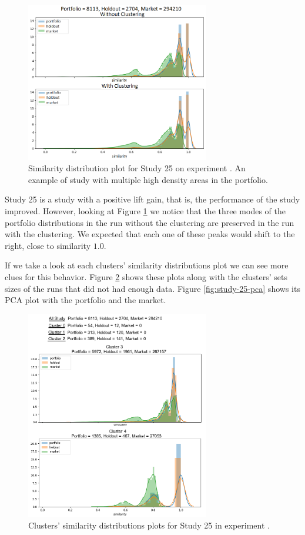 \begin{figure}[H]
   \centering
   \includegraphics[width=8cm]{fig/ch4-bump-study-25.png}
   \caption{Similarity distribution plot for Study 25 on experiment \nameExperimentII{}. An example of study with multiple high density areas in the portfolio.}
   \label{fig:bump-study-25}
\end{figure}

Study 25 is a study with a positive lift gain, that is, the performance of the study improved. However, looking at Figure \ref{fig:bump-study-25} we notice that the three modes of the portfolio distributions in the run without the clustering are preserved in the run with the clustering. We expected that each one of these peaks would shift to the right, close to similarity $1.0$. 

If we take a look at each clusters' similarity distributions plot we can see more clues for this behavior. Figure \ref{fig:study-25-clusters-simi-plot} shows these plots along with the clusters' sets sizes of the runs that did not had enough data. Figure \ref{fig:study-25-pca} shows its PCA plot with the portfolio and the market. 

\begin{figure}[!ht]
   \centering
   \includegraphics[width=8cm]{fig/ch4-study-25-clusters-simi-plot.png}
   \caption{Clusters' similarity distributions plots for Study 25 in experiment \nameExperimentI{}.}
   \label{fig:study-25-clusters-simi-plot}
\end{figure}

